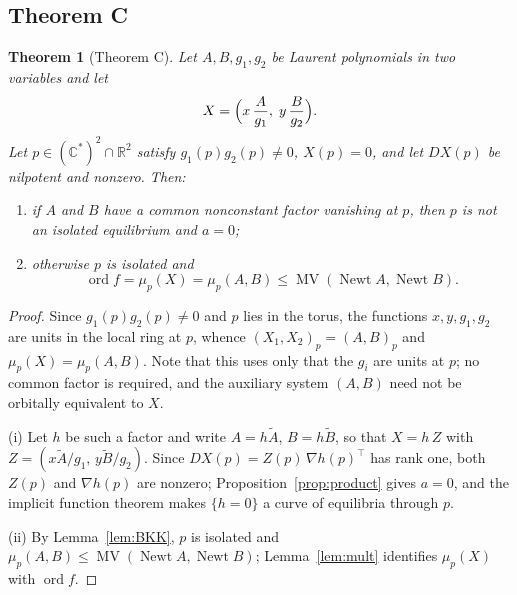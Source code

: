 \documentclass[12pt]{article}
\theoremstyle{plain}
\newtheorem{theorem}{Theorem}[section]
\theoremstyle{definition}
\theoremstyle{remark}
\newcommand{\R}{\mathbb{R}}
\newcommand{\C}{\mathbb{C}}
\DeclareMathOperator{\MV}{MV}
\DeclareMathOperator{\Newt}{Newt}
\begin{document}
	\subsection{Theorem C}
	
	\begin{theorem}[Theorem C]\label{thm:C}
		Let $A,B,g_{1},g_{2}$ be Laurent polynomials in two variables and let
		\[
		X=\Bigl(x\,\frac{A}{g_{1}},\;y\,\frac{B}{g_{2}}\Bigr).
		\]
		Let $p\in(\C^{*})^{2}\cap\R^{2}$ satisfy $g_{1}(p)g_{2}(p)\neq0$,
		$X(p)=0$, and let $DX(p)$ be nilpotent and nonzero.  Then:
		\begin{enumerate}[label=\rm(\roman*)]
			\item if $A$ and $B$ have a common nonconstant factor vanishing at $p$,
			then $p$ is not an isolated equilibrium and $a=0$;
			\item otherwise $p$ is isolated and
			\[
			\operatorname{ord}f=\mu_{p}(X)=\mu_{p}(A,B)
			\le\MV(\Newt A,\Newt B).
			\]
		\end{enumerate}
	\end{theorem}
	
	\begin{proof}
		Since $g_{1}(p)g_{2}(p)\neq0$ and $p$ lies in the torus, the functions
		$x,y,g_{1},g_{2}$ are units in the local ring at $p$, whence
		$(X_{1},X_{2})_{p}=(A,B)_{p}$ and $\mu_{p}(X)=\mu_{p}(A,B)$.  Note that
		this uses only that the $g_{i}$ are units at $p$; no common factor is
		required, and the auxiliary system $(A,B)$ need not be orbitally
		equivalent to $X$.
		
		(i) Let $h$ be such a factor and write $A=h\widetilde A$,
		$B=h\widetilde B$, so that
		$X=h\,Z$ with $Z=(x\widetilde A/g_{1},\,y\widetilde B/g_{2})$.  Since
		$DX(p)=Z(p)\,\nabla h(p)^{\top}$ has rank one, both $Z(p)$ and
		$\nabla h(p)$ are nonzero; Proposition~\ref{prop:product} gives $a=0$,
		and the implicit function theorem makes $\{h=0\}$ a curve of equilibria
		through $p$.
		
		(ii) By Lemma~\ref{lem:BKK}, $p$ is isolated and
		$\mu_{p}(A,B)\le\MV(\Newt A,\Newt B)$; Lemma~\ref{lem:mult} identifies
		$\mu_{p}(X)$ with $\operatorname{ord}f$.
	\end{proof}
	
\end{document}
